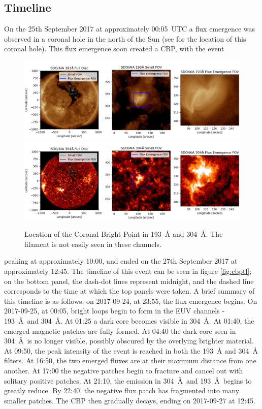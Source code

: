 \subsection{Timeline}
On the 25th September 2017 at approximately 00:05~UTC a flux emergence was observed in a coronal hole in the north of the Sun (see  for the location of this coronal hole). This flux emergence soon created a CBP, with the event 
\begin{figure}
    \centering
    \includegraphics[width=\linewidth]{./04CBPs/figs/193context.png}
    \includegraphics[width=\linewidth]{./04CBPs/figs/304context.png}
    \caption[Location of the Coronal Bright Point in 193~\AA{} and 304~\AA.]{Location of the Coronal Bright Point in 193~\AA{} and 304~\AA{}. The filament is not easily seen in these channels.}
    \label{fig:setup}
\end{figure} %
peaking at approximately 10:00, and ended on the 27th September 2017 at approximately 12:45. The timeline of this event can be seen in figure \ref{fig:cbptl}; on the bottom panel, the dash-dot lines represent midnight, and the dashed line corresponds to the time at which the top panels were taken. A brief summary of this timeline is as follows; on 2017-09-24, at 23:55, the flux emergence begins. On 2017-09-25, at 00:05, bright loops begin to form in the EUV channels - 193~\AA\ and 304~\AA. At 01:25 a dark core becomes visible in 304~\AA. At 01:40, the emerged magnetic patches are fully formed. At 04:40 the dark core seen in 304~\AA\ is no longer visible, possibly obscured by the overlying brighter material. At 09:50, the peak intensity of the event is reached in both the 193~\AA{} and 304~\AA{} filters. At 16:50, the two emerged fluxes are at their maximum distance from one another. At 17:00 the negative patches begin to fracture and cancel out with solitary positive patches. At 21:10, the emission in 304~\AA\ and 193~\AA\ begins to greatly reduce. By 22:40, the negative flux patch has fragmented into many smaller patches. The CBP then gradually decays, ending on 2017-09-27 at 12:45.

